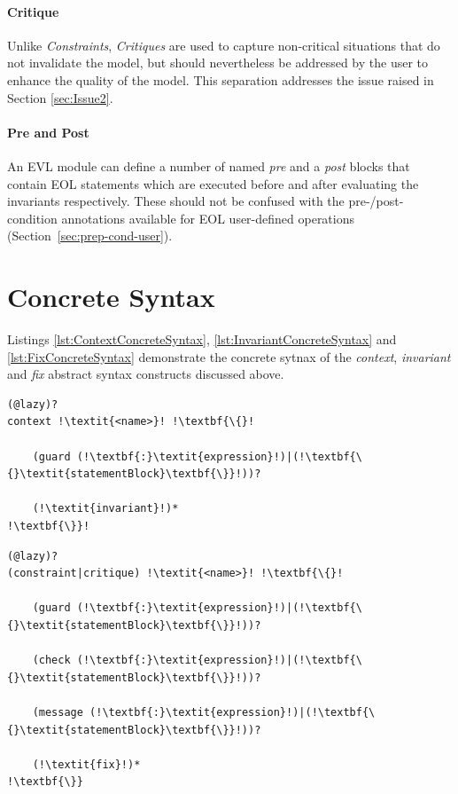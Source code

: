 \paragraph{Critique}
Unlike \emph{Constraints}, \emph{Critiques} are used to capture non-critical situations that do not invalidate the model, but should nevertheless be addressed by the user to enhance the quality of the model. This separation addresses the issue raised in Section \ref{sec:Issue2}.

\paragraph{Pre and Post}
An EVL module can define a number of named \emph{pre} and a \emph{post} blocks that contain EOL statements which are executed before and after evaluating the invariants respectively. These should not be confused with the pre-/post-condition annotations available for EOL user-defined operations (Section~\ref{sec:prep-cond-user}).

\section{Concrete Syntax}

Listings \ref{lst:ContextConcreteSyntax}, \ref{lst:InvariantConcreteSyntax} and \ref{lst:FixConcreteSyntax} demonstrate the concrete sytnax of the \emph{context}, \emph{invariant} and \emph{fix} abstract syntax constructs discussed above.

\begin{lstlisting}[caption=Concrete Syntax of an EVL context, label=lst:ContextConcreteSyntax, language=EVL, escapechar=!]
(@lazy)?
context !\textit{<name>}! !\textbf{\{}!

	(guard (!\textbf{:}\textit{expression}!)|(!\textbf{\{}\textit{statementBlock}\textbf{\}}!))?
	
	(!\textit{invariant}!)*
!\textbf{\}}!
\end{lstlisting}

\begin{lstlisting}[caption=Concrete Syntax of an EVL invariant, label=lst:InvariantConcreteSyntax, language=EVL, escapechar=!]
(@lazy)?
(constraint|critique) !\textit{<name>}! !\textbf{\{}!
	
	(guard (!\textbf{:}\textit{expression}!)|(!\textbf{\{}\textit{statementBlock}\textbf{\}}!))?
	
	(check (!\textbf{:}\textit{expression}!)|(!\textbf{\{}\textit{statementBlock}\textbf{\}}!))?
	
	(message (!\textbf{:}\textit{expression}!)|(!\textbf{\{}\textit{statementBlock}\textbf{\}}!))?
	
	(!\textit{fix}!)*
!\textbf{\}}
\end{lstlisting}

